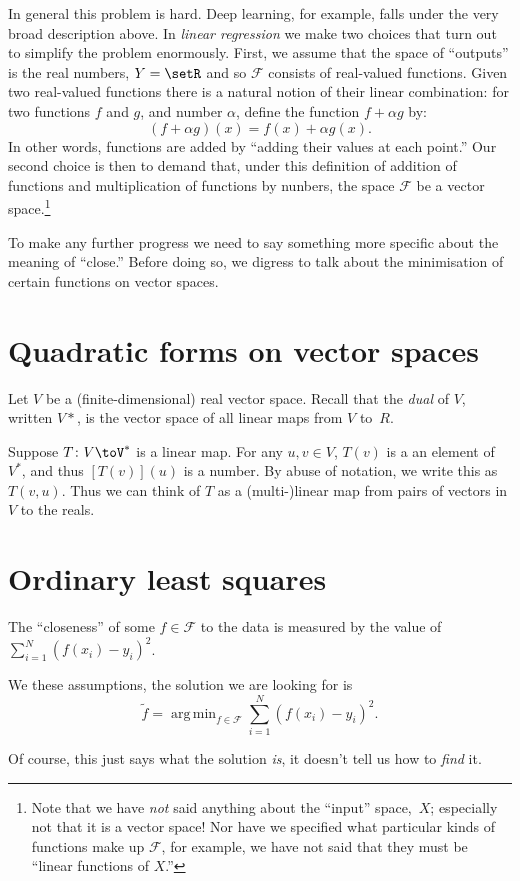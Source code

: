 \documentclass[11pt, a4paper]{article}
\DeclareMathOperator*{\argmin}{arg\,min}
\begin{document}
In general this problem is hard. Deep learning, for example, falls
under the very broad description above. In \emph{linear regression} we
make two choices that turn out to simplify the problem enormously.
First, we assume that the space of “outputs” is the real numbers, $Y =
\setR$ and so $\mathcal{F}$ consists of real-valued functions. Given two
real-valued functions there is a natural notion of their linear
combination: for two functions $f$ and $g$, and number $\alpha$, define the
function $f+\alpha g$ by:
\begin{equation*}
  (f+\alpha g)(x) = f(x) + \alpha g(x).
\end{equation*}
In other words, functions are added by “adding their values at each
point.” Our second choice is then to demand that, under this
definition of addition of functions and multiplication of functions by
nunbers, the space $\mathcal{F}$ be a vector space.\footnote{Note that we have
\emph{not} said anything about the “input” space,~$X$; especially not
that it is a vector space! Nor have we specified what particular kinds
of functions make up $\mathcal{F}$, for example, we have not said that they must
be “linear functions of $X$.”}

To make any further progress we need to say something more specific
about the meaning of “close.” Before doing so, we digress to talk
about the minimisation of certain functions on vector spaces.

\section{Quadratic forms on vector spaces}

Let $V$ be a (finite-dimensional) real vector space. Recall that the
\emph{dual} of $V$, written $V*$, is the vector space of all linear
maps from $V$ to~$R$. 

Suppose $T\colon V\toV^*$ is a linear map. For any $u, v\in V$, $T(v)$
is a an element of $V^*$, and thus $[T(v)](u)$ is a number. By abuse
of notation, we write this as $T(v,u)$. Thus we can think of $T$ as a
(multi-)linear map from pairs of vectors in $V$ to the reals.




\section{Ordinary least squares}



The “closeness” of some $f\in\mathcal{F}$ to the data is measured by the
  value of $\sum_{i=1}^N{(f(x_i) - y_i)}^2$.


We these assumptions, the solution we are looking for is
\begin{equation*}
  \tilde{f} = \argmin_{f\in\mathcal{F}} \sum_{i=1}^N {(f(x_i) - y_i)}^2.
\end{equation*}

Of course, this just says what the solution \emph{is}, it doesn't tell
us how to \emph{find} it.
\end{document}
